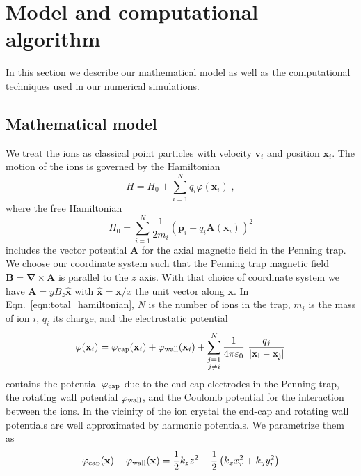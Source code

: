 \documentclass[aps, pra, preprint]{revtex4-1}
\newcommand{\hzero}{H_0}
\newcommand{\phicap}{\varphi_{\rm cap}}
\newcommand{\phiwall}{\varphi_{\rm wall}}
\begin{document}
\section{Model and computational algorithm}
\label{sec:model}

In this section we describe our mathematical model as well as the
computational techniques used in our numerical simulations.


\subsection{Mathematical model}

We treat the ions as classical point particles with 
velocity $\mathbf{v}_i$ and position $\mathbf{x}_i$. The motion
of the ions is governed by the Hamiltonian
\begin{equation}
  H = \hzero + \sum_{i=1}^N q_i\varphi(\mathbf{x}_i)\;,
\end{equation}
where the free Hamiltonian
\begin{equation}
  \hzero =
  \sum_{i=1}^N \frac{1}{2m_i}\left(
    \mathbf{p}_i -
    q_i\mathbf{A}(\mathbf{x}_i) \right)^2 
  \label{eqn:total_hamiltonian}
\end{equation}
includes the vector potential $\mathbf{A}$ for the axial magnetic
field in the Penning trap. We choose our coordinate system such
that the Penning trap magnetic field $\mathbf{B} =
\mathbf{\nabla}\times \mathbf{A}$ is parallel to the $z$ axis.
With that choice of coordinate system we have $\mathbf{A} =
yB_z\mathbf{\hat x}$ with $\mathbf{\hat x}=\mathbf{x}/x$ the unit
vector along $\mathbf{x}$. In Eqn.~\eqref{eqn:total_hamiltonian},
$N$ is the number of ions in the trap, $m_i$ is the mass of ion
$i$, $q_i$ its charge, and the electrostatic potential
\begin{equation}
  \varphi(\mathbf{x}_i) =
  \phicap(\mathbf{x}_i) +
  \phiwall(\mathbf{x}_i) +
  \sum_{\substack{j=1\\j\neq i}}^N
  \frac{1}{4\pi\varepsilon_0}\
  \frac{q_j}{\left| \mathbf{x_i} - \mathbf{x_j} \right|}
\end{equation}
contains the potential $\phicap$ due to the end-cap electrodes in
the Penning trap, the rotating wall potential $\phiwall$, and the
Coulomb potential for the interaction between the ions. In the
vicinity of the ion crystal the end-cap and rotating wall
potentials are well approximated by harmonic potentials. We
parametrize them as
\begin{equation}
  \phicap(\mathbf{x}) +\phiwall(\mathbf{x}) =\frac{1}{2}k_z z^2 - 
\frac{1}{2} \left(k_x x_r^2 + k_y y_r^2\right)
\end{equation}
\end{document}
